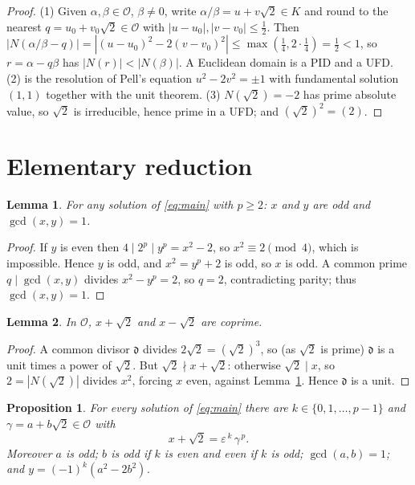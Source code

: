 \documentclass{amsart}
\newtheorem{lemma}{Lemma}
\newtheorem{proposition}{Proposition}
\theoremstyle{definition}
\begin{document}
\begin{proof}
(1) Given $\alpha,\beta\in\mathcal{O}$, $\beta\ne0$, write
$\alpha/\beta=u+v\sqrt2\in K$ and round to the nearest $q=u_0+v_0\sqrt2\in
\mathcal O$ with $|u-u_0|,|v-v_0|\le\frac12$. Then
$|N(\alpha/\beta-q)|=|(u-u_0)^2-2(v-v_0)^2|\le\max(\tfrac14,2\cdot\tfrac14)=\tfrac12<1$,
so $r=\alpha-q\beta$ has $|N(r)|<|N(\beta)|$. A Euclidean domain is a PID and a
UFD. (2) is the resolution of Pell's equation $u^2-2v^2=\pm1$ with
fundamental solution $(1,1)$ together with the unit theorem. (3) $N(\sqrt2)=-2$
has prime absolute value, so $\sqrt2$ is irreducible, hence prime in a UFD; and
$(\sqrt2)^2=(2)$.
\end{proof}

\section{Elementary reduction}\label{sec:reduction}

\begin{lemma}\label{lem:parity}
For any solution of \eqref{eq:main} with $p\ge2$: $x$ and $y$ are odd and
$\gcd(x,y)=1$.
\end{lemma}

\begin{proof}
If $y$ is even then $4\mid 2^p\mid y^p=x^2-2$, so $x^2\equiv2\pmod4$, which is
impossible. Hence $y$ is odd, and $x^2=y^p+2$ is odd, so $x$ is odd. A common
prime $q\mid\gcd(x,y)$ divides $x^2-y^p=2$, so $q=2$, contradicting parity;
thus $\gcd(x,y)=1$.
\end{proof}

\begin{lemma}\label{lem:coprime}
In $\mathcal{O}$, $x+\sqrt2$ and $x-\sqrt2$ are coprime.
\end{lemma}

\begin{proof}
A common divisor $\mathfrak d$ divides $2\sqrt2=(\sqrt2)^3$, so (as $\sqrt2$ is
prime) $\mathfrak d$ is a unit times a power of $\sqrt2$. But $\sqrt2\nmid
x+\sqrt2$: otherwise $\sqrt2\mid x$, so $2=|N(\sqrt2)|$ divides $x^2$, forcing
$x$ even, against Lemma~\ref{lem:parity}. Hence $\mathfrak d$ is a unit.
\end{proof}

\begin{proposition}\label{prop:reduction}
For every solution of \eqref{eq:main} there are $k\in\{0,1,\dots,p-1\}$ and
$\gamma=a+b\sqrt2\in\mathcal{O}$ with
\begin{equation}\label{eq:factor}
x+\sqrt2=\varepsilon^{\,k}\,\gamma^{\,p}.
\end{equation}
Moreover $a$ is odd; $b$ is odd if $k$ is even and even if $k$ is odd;
$\gcd(a,b)=1$; and $y=(-1)^k(a^2-2b^2)$.
\end{proposition}
\end{document}
